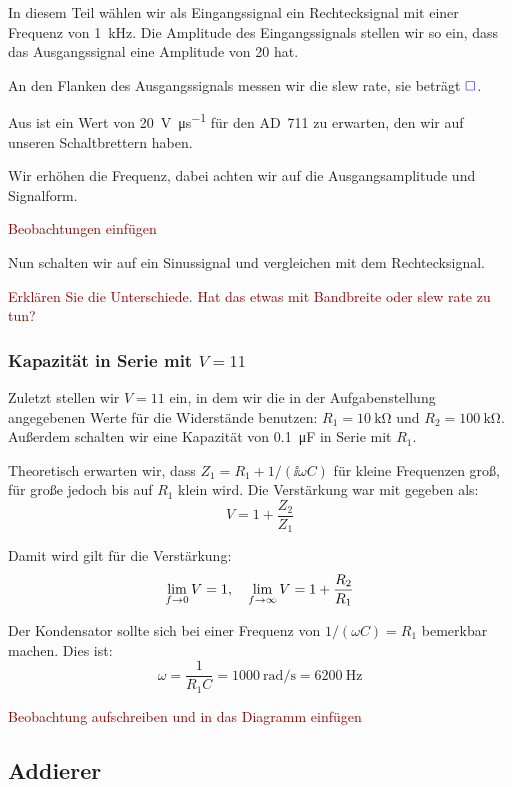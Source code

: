 In diesem Teil wählen wir als Eingangssignal ein Rechtecksignal mit einer
Frequenz von \SI{1}{\kilo\hertz}. Die Amplitude des Eingangssignals stellen wir
so ein, dass das Ausgangssignal eine Amplitude von \SI{20}{\voltss} hat.

An den Flanken des Ausgangssignals messen wir die slew rate, sie beträgt
$\textcolor{blue}{\square}$.

Aus \cite[Tabelle~5/6.1]{physik313-Anleitung} ist ein Wert von
\SI{20}{\volt\per\micro\second} für den AD~711 zu erwarten, den wir auf unseren
Schaltbrettern haben.

Wir erhöhen die Frequenz, dabei achten wir auf die Ausgangsamplitude und
Signalform.

\textcolor{darkred}{Beobachtungen einfügen}

Nun schalten wir auf ein Sinussignal und vergleichen mit dem Rechtecksignal.

\textcolor{darkred}{%
	Erklären Sie die Unterschiede. Hat das etwas mit Bandbreite oder slew rate
	zu tun?
}

\subsubsection{Kapazität in Serie mit $V = 11$}

Zuletzt stellen wir $V = 11$ ein, in dem wir die in der Aufgabenstellung
angegebenen Werte für die Widerstände benutzen: $R_1 = \SI{10}{\kilo\ohm}$ und
$R_2 = \SI{100}{\kilo\ohm}$. Außerdem schalten wir eine Kapazität von
\SI{.1}{\micro\farad} in Serie mit $R_1$.

Theoretisch erwarten wir, dass $Z_1 = R_1 + 1/(\ii \omega C)$ für kleine
Frequenzen groß, für große jedoch bis auf $R_1$ klein wird. Die Verstärkung war
mit gegeben als:
\[
	V = 1 + \frac{Z_2}{Z_1}
\]

Damit wird gilt für die Verstärkung:
\[
	\lim_{f \to 0} V = 1
	,\quad
	\lim_{f \to \infty} V = 1 + \frac{R_2}{R_1}
\]

Der Kondensator sollte sich bei einer Frequenz von $1/(\omega C) = R_1$
bemerkbar machen. Dies ist:
\[
	\omega = \frac1{R_1 C} = \SI{1000}{\radian\per\second} = \SI{6200}\hertz
\]

\textcolor{darkred}{Beobachtung aufschreiben und in das Diagramm einfügen}

\FloatBarrier
\subsection{Addierer}

